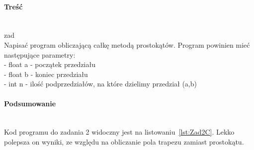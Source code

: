 \paragraph{Treść}~\\
{zad}\\
Napisać program obliczającą całkę metodą prostokątów.
Program powinien mieć następujące parametry:\\
- float a - początek przedziału\\
- float b - koniec przedziału\\
- int n - ilość podprzedziałów, na które dzielimy przedział (a,b)



\paragraph{Podsumowanie}~\\
Kod programu do zadania 2 widoczny jest na listowaniu~\ref{lst:Zad2C}.
Lekko polepsza on wyniki, ze względu na obliczanie pola trapezu zamiast prostokątu.
